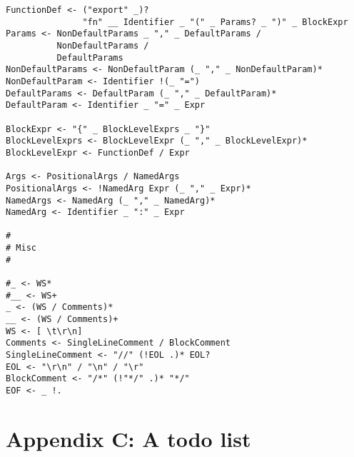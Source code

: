 \begin{verbatim}
FunctionDef <- ("export" _)?
               "fn" __ Identifier _ "(" _ Params? _ ")" _ BlockExpr
Params <- NonDefaultParams _ "," _ DefaultParams /
          NonDefaultParams /
          DefaultParams
NonDefaultParams <- NonDefaultParam (_ "," _ NonDefaultParam)*
NonDefaultParam <- Identifier !(_ "=")
DefaultParams <- DefaultParam (_ "," _ DefaultParam)*
DefaultParam <- Identifier _ "=" _ Expr

BlockExpr <- "{" _ BlockLevelExprs _ "}"
BlockLevelExprs <- BlockLevelExpr (_ "," _ BlockLevelExpr)*
BlockLevelExpr <- FunctionDef / Expr

Args <- PositionalArgs / NamedArgs
PositionalArgs <- !NamedArg Expr (_ "," _ Expr)*
NamedArgs <- NamedArg (_ "," _ NamedArg)*
NamedArg <- Identifier _ ":" _ Expr

#
# Misc
#

#_ <- WS*
#__ <- WS+
_ <- (WS / Comments)*
__ <- (WS / Comments)+
WS <- [ \t\r\n]
Comments <- SingleLineComment / BlockComment
SingleLineComment <- "//" (!EOL .)* EOL?
EOL <- "\r\n" / "\n" / "\r"
BlockComment <- "/*" (!"*/" .)* "*/"
EOF <- _ !.
\end{verbatim}

\hypertarget{appendix-c-a-todo-list}{%
\section{Appendix C: A todo list}\label{appendix-c-a-todo-list}}


